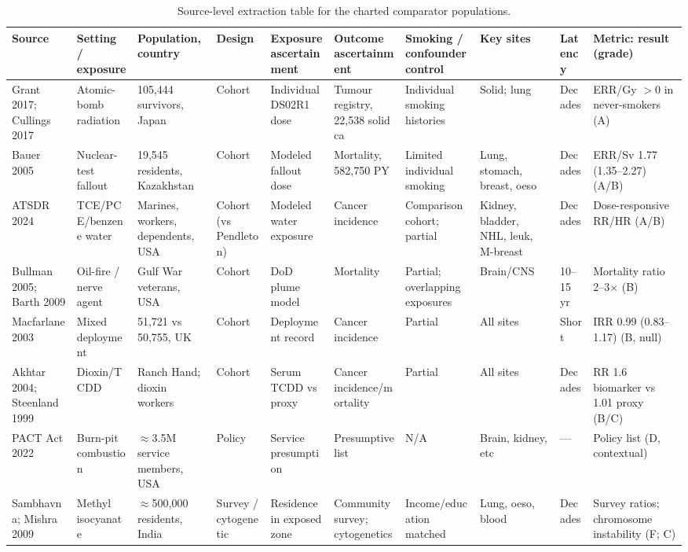 \documentclass[11pt]{article}
\begin{document}
\begin{table}
\centering
\caption{Source-level extraction table for the charted comparator populations.}
\label{tab:extract}
\scriptsize
\setlength{\tabcolsep}{3pt}
\begin{tabular}{@{}L{0.10\textwidth}L{0.10\textwidth}L{0.09\textwidth}L{0.07\textwidth}L{0.10\textwidth}L{0.09\textwidth}L{0.09\textwidth}L{0.08\textwidth}L{0.06\textwidth}L{0.10\textwidth}@{}}
\toprule
Source & Setting / exposure & Population, country & Design & Exposure ascertainment & Outcome ascertainment & Smoking / confounder control & Key sites & Latency & Metric: result (grade) \\
\midrule
Grant 2017; Cullings 2017 & Atomic-bomb radiation & 105,444 survivors, Japan & Cohort & Individual DS02R1 dose & Tumour registry, 22,538 solid ca & Individual smoking histories & Solid; lung & Decades & ERR/Gy $>$0 in never-smokers (A) \\
Bauer 2005 & Nuclear-test fallout & 19,545 residents, Kazakhstan & Cohort & Modeled fallout dose & Mortality, 582,750 PY & Limited individual smoking & Lung, stomach, breast, oeso & Decades & ERR/Sv 1.77 (1.35--2.27) (A/B) \\
ATSDR 2024 & TCE/PCE/benzene water & Marines, workers, dependents, USA & Cohort (vs Pendleton) & Modeled water exposure & Cancer incidence & Comparison cohort; partial & Kidney, bladder, NHL, leuk, M-breast & Decades & Dose-responsive RR/HR (A/B) \\
Bullman 2005; Barth 2009 & Oil-fire / nerve agent & Gulf War veterans, USA & Cohort & DoD plume model & Mortality & Partial; overlapping exposures & Brain/CNS & 10--15 yr & Mortality ratio 2--3$\times$ (B) \\
Macfarlane 2003 & Mixed deployment & 51,721 vs 50,755, UK & Cohort & Deployment record & Cancer incidence & Partial & All sites & Short & IRR 0.99 (0.83--1.17) (B, null) \\
Akhtar 2004; Steenland 1999 & Dioxin/TCDD & Ranch Hand; dioxin workers & Cohort & Serum TCDD vs proxy & Cancer incidence/mortality & Partial & All sites & Decades & RR 1.6 biomarker vs 1.01 proxy (B/C) \\
PACT Act 2022 & Burn-pit combustion & $\approx$3.5M service members, USA & Policy & Service presumption & Presumptive list & N/A & Brain, kidney, etc & --- & Policy list (D, contextual) \\
Sambhavna; Mishra 2009 & Methyl isocyanate & $\approx$500,000 residents, India & Survey / cytogenetic & Residence in exposed zone & Community survey; cytogenetics & Income/education matched & Lung, oeso, blood & Decades & Survey ratios; chromosome instability (F; C) \\

\end{tabular}
\end{table}
\end{document}
